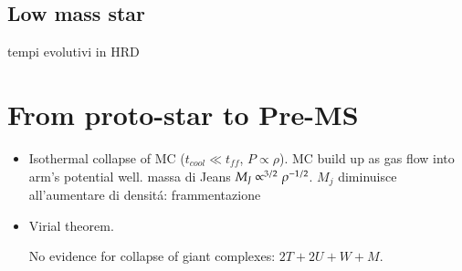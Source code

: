 \subsection{Low mass star}

tempi evolutivi in HRD


\section{From proto-star to Pre-MS}

\begin{itemize}
\item Isothermal collapse of MC ($t_{cool}\ll t_{ff}$, $P\propto\rho$). MC build up as gas flow into arm's potential well. massa di Jeans $M_J\propto^{3/2}\rho^{-1/2}$. $M_j$ diminuisce all'aumentare di densit\'a: frammentazione
\item Virial theorem.






No evidence for collapse of giant complexes: $2T+2U+W+M$.





\end{itemize}
